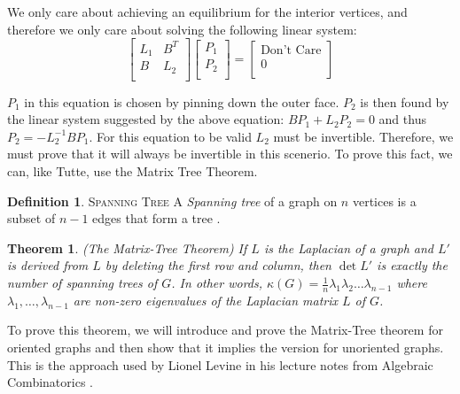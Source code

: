 \documentclass[11pt]{article}
\newtheorem{theorem}{Theorem}[section]
\theoremstyle{definition}
\newtheorem{definition}{Definition}[section]
\begin{document}
	We only care about achieving an equilibrium for the interior vertices, and therefore we only care about solving the following linear system:
		\begin{equation}
			\begin{bmatrix}
				L_1 & B^T \\
				B & L_2 \\
			\end{bmatrix}
			\begin{bmatrix}
			 	P_1 \\
    				P_2 \\
			\end{bmatrix}
			=
			\begin{bmatrix}
				\text{Don't Care} \\
				0 \\
			\end{bmatrix}
		\end{equation}
	
	$P_1$ in this equation is chosen by pinning down the outer face.
	$P_2$ is then found by the linear system suggested by the above equation: $BP_1 + L_2P_2 = 0$ and thus $P_2 = -L_2^{-1}BP_1$. 
	For this equation to be valid $L_2$ must be invertible. Therefore, we must prove that it will always be invertible in this scenerio.
	To prove this fact, we can, like Tutte, use the Matrix Tree Theorem.
	
	\theoremstyle{definition}
	\begin{definition}{\textsc{Spanning Tree}}
		A \emph{Spanning tree} of a graph on $n$ vertices is a subset of $n-1$ edges that form a tree \cite{mathworld:SpanningTree}.
	\end{definition}
	
	\begin{theorem}{(The Matrix-Tree Theorem)}
		If $L$ is the Laplacian of a graph and $L'$ is derived from $L$ by deleting the first row and column, then $\det L'$ is exactly the number of spanning trees of $G$.
		In other words, $\kappa(G) = \frac{1}{n} \lambda_1\lambda_2 \dots \lambda_{n-1}$ where $\lambda_1, \dots, \lambda_{n-1}$ are non-zero eigenvalues of the Laplacian matrix $L$ of $G$.
	\end{theorem}
	
	To prove this theorem, we will introduce and prove the Matrix-Tree theorem for oriented graphs and then show that it implies the version for unoriented graphs.
	This is the approach used by Lionel Levine in his lecture notes from Algebraic Combinatorics \cite{matrixTree}.
	
\end{document}

